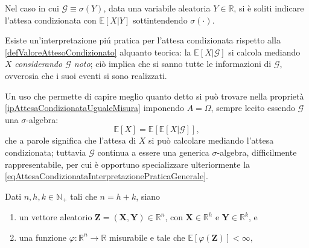 
    \begin{oss}
      Nel caso in cui \(\mathcal G\equiv\sigma(Y)\), data una variabile aleatoria \(Y\in\mathbb R\), si è soliti indicare l'attesa condizionata con \(\mathbb E[X|Y]\) sottintendendo \(\sigma(\cdot)\).
    \end{oss}

    \begin{oss}
      \label{ossAttesaCondizionataInterpretazionePratica}
      Esiste un'interpretazione piú pratica per l'attesa condizionata rispetto alla \cref{defValoreAttesoCondizionato} alquanto teorica: la \(\mathbb E[X|\mathcal G]\) si calcola mediando \(X\) \textit{considerando \(\mathcal G\) noto}; ciò implica che si sanno tutte le informazioni di \(\mathcal G\), ovverosia che i suoi eventi si sono realizzati.
      
      Un uso che permette di capire meglio quanto detto si può trovare nella proprietà \ref{ipAttesaCondizionataUgualeMisura} imponendo \(A=\Omega\), sempre lecito essendo \(\mathcal G\) una \(\sigma\)-al\-ge\-bra:
      \begin{equation}
        \label{eqAttesaCondizionataInterpretazionePraticaGenerale}
        \mathbb E[X]
        =\mathbb E[\mathbb E[X|\mathcal G]],
      \end{equation}
      che a parole significa che l'attesa di \(X\) si può calcolare mediando l'attesa condizionata; tuttavia \(\mathcal G\) continua a essere una generica \(\sigma\)-algebra, difficilmente rappresentabile, per cui è opportuno specializzare ulteriormente la \cref{eqAttesaCondizionataInterpretazionePraticaGenerale}.
      
      Dati \(n,h,k\in\mathbb N_+\) tali che \(n=h+k\), siano

      \begin{enumerate}[
        label=\arabic*.,
        topsep=0.5em,
        parsep=0em,
        itemsep=0.25em,
        leftmargin=2em,
        rightmargin=1.5em,
      ]
        \item un vettore aleatorio \(\mathbf Z=(\mathbf X,\mathbf Y)\in\mathbb R^n\), con \(\mathbf X\in\mathbb R^h\) e \(\mathbf Y\in\mathbb R^k\), e%
        \item una funzione \(\varphi\colon\mathbb R^n\to\mathbb R\) misurabile e tale che \(\mathbb E[\varphi(\mathbf Z)]<\infty,\)%
      \end{enumerate}


\end{oss}
